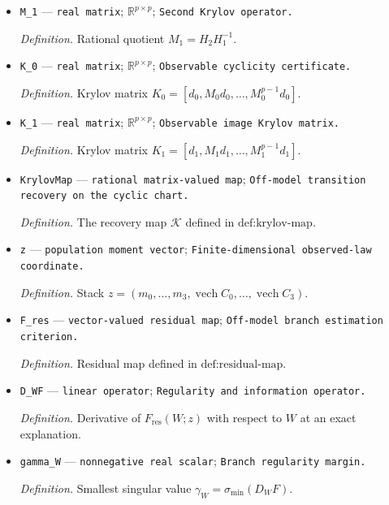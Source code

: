 \documentclass{article}
\begin{document}
\begin{itemize}
  \par\smallskip\noindent\emph{Definition.} Rational quotient \(M_0=H_1H_0^{-1}\).
  \item \texttt{M\_\allowbreak{}1} --- \texttt{real matrix}; \(\mathbb R^{p\times p}\); \texttt{Second Krylov operator.}
  \par\smallskip\noindent\emph{Definition.} Rational quotient \(M_1=H_2H_1^{-1}\).
  \item \texttt{K\_\allowbreak{}0} --- \texttt{real matrix}; \(\mathbb R^{p\times p}\); \texttt{Observable cyclicity certificate.}
  \par\smallskip\noindent\emph{Definition.} Krylov matrix \(K_0=[d_0,M_0d_0,\ldots,M_0^{p-1}d_0]\).
  \item \texttt{K\_\allowbreak{}1} --- \texttt{real matrix}; \(\mathbb R^{p\times p}\); \texttt{Observable image Krylov matrix.}
  \par\smallskip\noindent\emph{Definition.} Krylov matrix \(K_1=[d_1,M_1d_1,\ldots,M_1^{p-1}d_1]\).
  \item \texttt{KrylovMap} --- \texttt{rational matrix-\allowbreak{}valued map}; \texttt{Off-\allowbreak{}model transition recovery on the cyclic chart.}
  \par\smallskip\noindent\emph{Definition.} The recovery map \(\mathcal K\) defined in \(\text{def:krylov-map}\).
  \item \texttt{z} --- \texttt{population moment vector}; \texttt{Finite-\allowbreak{}dimensional observed-\allowbreak{}law coordinate.}
  \par\smallskip\noindent\emph{Definition.} Stack \(z=(m_0,\ldots,m_3,\operatorname{vech}C_0,\ldots,\operatorname{vech}C_3)\).
  \item \texttt{F\_\allowbreak{}res} --- \texttt{vector-\allowbreak{}valued residual map}; \texttt{Off-\allowbreak{}model branch estimation criterion.}
  \par\smallskip\noindent\emph{Definition.} Residual map defined in \(\text{def:residual-map}\).
  \item \texttt{D\_\allowbreak{}WF} --- \texttt{linear operator}; \texttt{Regularity and information operator.}
  \par\smallskip\noindent\emph{Definition.} Derivative of \(F_{\mathrm{res}}(W;z)\) with respect to \(W\) at an exact explanation.
  \item \texttt{gamma\_\allowbreak{}W} --- \texttt{nonnegative real scalar}; \texttt{Branch regularity margin.}
  \par\smallskip\noindent\emph{Definition.} Smallest singular value \(\gamma_W=\sigma_{\min}(D_WF)\).

\end{itemize}
\end{document}
